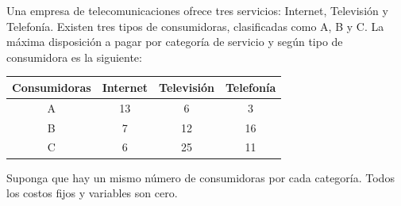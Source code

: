 \question Una empresa de telecomunicaciones ofrece tres servicios: Internet, Televisión y Telefonía. Existen tres tipos de consumidoras, clasificadas como A, B y C. La máxima disposición a pagar por categoría de servicio y según tipo de consumidora es la siguiente:
\begin{center}
\begin{tabular}{cccc}
  Consumidoras & Internet & Televisión & Telefonía \\ \hline
  A & 13 & 6 & 3 \\
  B & 7 & 12 & 16 \\
  C & 6 & 25 & 11
\end{tabular}
\end{center}
Suponga que hay un mismo número de consumidoras por cada categoría. Todos los costos fijos y variables son cero.
